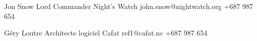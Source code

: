%
%
%


\begin{referees}
	{Jon Snow}
	{Lord Commander}
	{Night's Watch}
	{john.snow@nightwatch.org}
	{+687 987 654}

	{Géry Loutre}
	{Architecte logiciel}
	{Cafat}
	{ref1@cafat.nc}
	{+687 987 654}
\end{referees}


